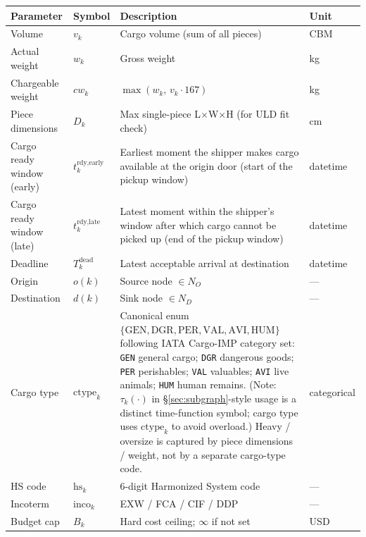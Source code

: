 \documentclass[11pt,a4paper]{article}
\newcommand{\ctype}{\text{ctype}}
\theoremstyle{definition}
\begin{document}
\begin{center}
\begin{tabular}{llp{6.5cm}l}
\toprule
Parameter & Symbol & Description & Unit \\
\midrule
Volume & $v_k$ & Cargo volume (sum of all pieces) & CBM \\
Actual weight & $w_k$ & Gross weight & kg \\
Chargeable weight & $cw_k$ & $\max(w_k,\, v_k \cdot 167)$ & kg \\
Piece dimensions & $D_k$ & Max single-piece L$\times$W$\times$H (for ULD fit check) & cm \\
Cargo ready window (early) & $t_k^{\text{rdy,early}}$ & Earliest moment the shipper makes cargo available at the origin door (start of the pickup window) & datetime \\
Cargo ready window (late) & $t_k^{\text{rdy,late}}$ & Latest moment within the shipper's window after which cargo cannot be picked up (end of the pickup window) & datetime \\
Deadline & $T_k^{\text{dead}}$ & Latest acceptable arrival at destination & datetime \\
Origin & $o(k)$ & Source node $\in N_O$ & — \\
Destination & $d(k)$ & Sink node $\in N_D$ & — \\
Cargo type & $\ctype_k$ & Canonical enum $\{\text{GEN}, \text{DGR}, \text{PER}, \text{VAL}, \text{AVI}, \text{HUM}\}$ following IATA Cargo-IMP category set: \texttt{GEN} general cargo; \texttt{DGR} dangerous goods; \texttt{PER} perishables; \texttt{VAL} valuables; \texttt{AVI} live animals; \texttt{HUM} human remains. (Note: $\tau_k(\cdot)$ in \S\ref{sec:subgraph}-style usage is a distinct time-function symbol; cargo type uses $\ctype_k$ to avoid overload.) Heavy / oversize is captured by piece dimensions / weight, not by a separate cargo-type code. & categorical \\
HS code & $\text{hs}_k$ & 6-digit Harmonized System code & — \\
Incoterm & $\text{inco}_k$ & EXW / FCA / CIF / DDP & — \\
Budget cap & $B_k$ & Hard cost ceiling; $\infty$ if not set & USD \\
\bottomrule
\end{tabular}
\end{center}
\end{document}
